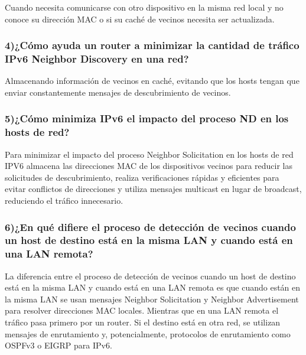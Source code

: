 \documentclass{article}
\begin{document}
Cuando necesita comunicarse con otro dispositivo en la misma red local y no conoce su dirección MAC o si su caché de vecinos necesita ser actualizada.

\subsubsection*{4)¿Cómo ayuda un router a minimizar la cantidad de tráfico IPv6 Neighbor Discovery en una red?}

Almacenando información de vecinos en caché, evitando que los hosts tengan que enviar constantemente mensajes de descubrimiento de vecinos.

\subsubsection*{5)¿Cómo minimiza IPv6 el impacto del proceso ND en los hosts de red?}

Para minimizar el impacto del proceso Neighbor Solicitation en los hosts de red IPV6 almacena las direcciones MAC de los dispositivos vecinos para reducir las solicitudes de descubrimiento, realiza verificaciones rápidas y eficientes para evitar conflictos de direcciones y utiliza mensajes multicast en lugar de broadcast, reduciendo el tráfico innecesario.

\subsubsection*{6)¿En qué difiere el proceso de detección de vecinos cuando un host de destino está en la misma LAN y cuando está en una LAN remota?}

La diferencia entre el proceso de detección de vecinos cuando un host de destino está en la misma LAN y cuando está en una LAN remota es que cuando están en la misma LAN se usan mensajes Neighbor Solicitation y Neighbor Advertisement para resolver direcciones MAC locales. Mientras que en una LAN remota el tráfico pasa primero por un router. Si el destino está en otra red, se utilizan mensajes de enrutamiento y, potencialmente, protocolos de enrutamiento como OSPFv3 o EIGRP para IPv6.
\end{document}
